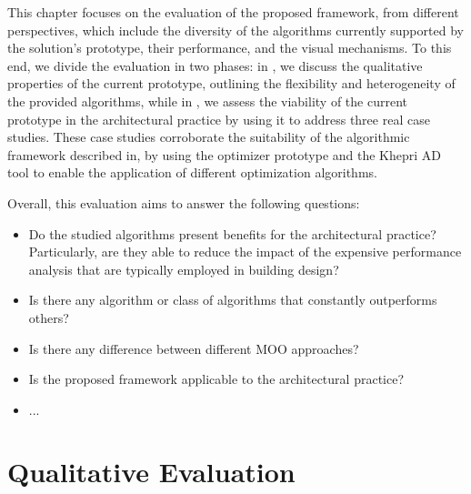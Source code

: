 \cleardoublepage
\label{chap:evaluation}
 
This chapter focuses on the evaluation of the proposed framework, from different perspectives, which include the diversity of the algorithms currently supported by the solution's prototype, their performance, and the visual mechanisms. To this end, we divide the evaluation in two phases: in , we discuss the qualitative properties of the current prototype, outlining the flexibility and heterogeneity of the provided algorithms, while in , we assess the viability of the current prototype in the architectural practice by using it to address three real case studies. These case studies corroborate the suitability of the algorithmic framework described in, by using the optimizer prototype and the Khepri \ac{AD} tool to enable the application of different optimization algorithms. 

Overall, this evaluation aims to answer the following questions: 
\begin{itemize}
	\item Do the studied algorithms present benefits for the architectural practice? Particularly, are they able to reduce the impact of the expensive performance analysis that are typically employed in building design?
	\item Is there any algorithm or class of algorithms that constantly outperforms others?
	\item Is there any difference between different \ac{MOO} approaches?
	\item Is the proposed framework applicable to the architectural practice? 
	\item ...
\end{itemize}

\section{Qualitative Evaluation}
\label{sec:qualitative}

